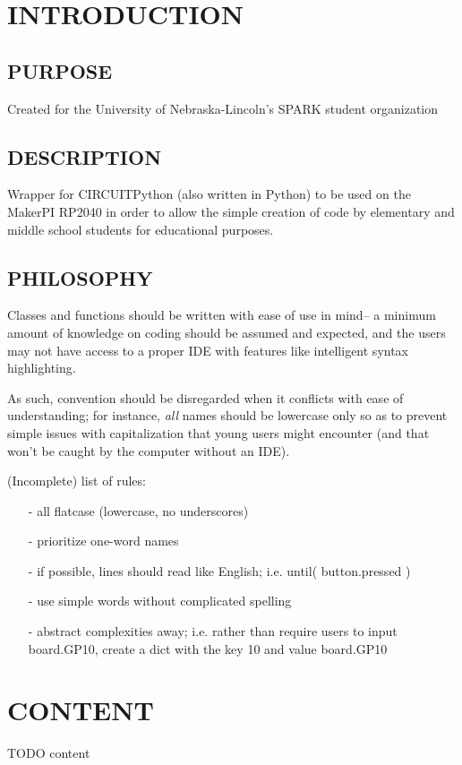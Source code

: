 \documentclass[12pt]{scrartcl} %
\begin{document}
\section{INTRODUCTION}

\subsection{PURPOSE}

Created for the University of Nebraska-Lincoln's SPARK student organization

\subsection{DESCRIPTION}

Wrapper for CIRCUITPython (also written in Python) to be used on the MakerPI
RP2040 in order to allow the simple creation of code by elementary and middle
school students for educational purposes.

\subsection{PHILOSOPHY}

Classes and functions should be written with ease of use in mind-- a minimum
amount of knowledge on coding should be assumed and expected, and the users may
not have access to a proper IDE with features like intelligent syntax
highlighting.

As such, convention should be disregarded when it conflicts with ease of
understanding; for instance, \emph{all} names should be lowercase only so as to
prevent simple issues with capitalization that young users might encounter (and
that won't be caught by the computer without an IDE).

(Incomplete) list of rules:

\begin{itemize}
  \item[-] all flatcase (lowercase, no underscores)
  \item[-] prioritize one-word names
  \item[-] if possible, lines should read like English; i.e. until( button.pressed )
  \item[-] use simple words without complicated spelling
  \item[-] abstract complexities away; i.e. rather than require users to input
    board.GP10, create a dict with the key 10 and value board.GP10
\end{itemize}

\newpage

\section{CONTENT}
\label{section:detailedDesignDescription}

TODO content

\end{document}
